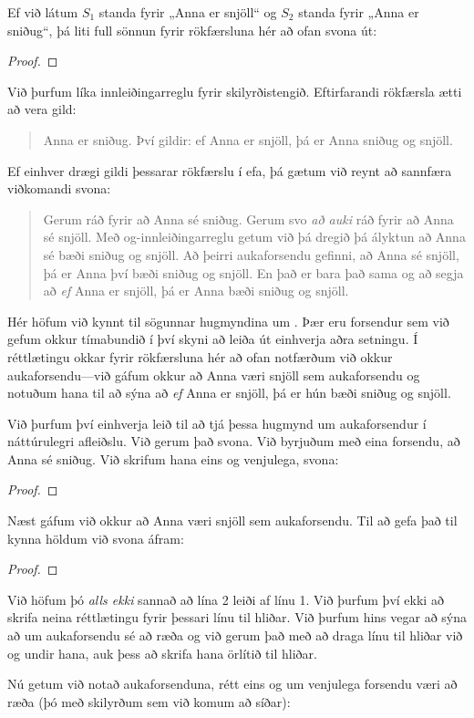 Ef við látum $S_1$ standa fyrir „Anna er snjöll“ og $S_2$ standa fyrir „Anna er sniðug“, þá liti full sönnun fyrir rökfærsluna hér að ofan svona út:
\begin{proof}
	\close
	 
\end{proof}
Við þurfum líka innleiðingarreglu fyrir skilyrðistengið. Eftirfarandi rökfærsla ætti að vera gild:
	\begin{quote}
		Anna er sniðug. Því gildir: ef Anna er snjöll, þá er Anna sniðug og snjöll.
	\end{quote}
Ef einhver drægi gildi þessarar rökfærslu í efa, þá gætum við reynt að sannfæra viðkomandi svona:
\begin{quote}
	Gerum ráð fyrir að Anna sé sniðug. Gerum svo \emph{að auki} ráð fyrir að Anna sé snjöll. Með og-innleiðingarreglu getum við þá dregið þá ályktun að Anna sé bæði sniðug og snjöll. Að þeirri aukaforsendu gefinni, að Anna sé snjöll, þá er Anna því bæði sniðug og snjöll. En það er bara það sama og að segja að \emph{ef} Anna er snjöll, þá er Anna bæði sniðug og snjöll.
\end{quote}
Hér höfum við kynnt til sögunnar hugmyndina um . Þær eru forsendur sem við gefum okkur tímabundið í því skyni að leiða út einhverja aðra setningu. Í réttlætingu okkar fyrir rökfærsluna hér að ofan notfærðum við okkur aukaforsendu---við gáfum okkur að Anna væri snjöll sem aukaforsendu og notuðum hana til að sýna að \emph{ef} Anna er snjöll, þá er hún bæði sniðug og snjöll. 

Við þurfum því einhverja leið til að tjá þessa hugmynd um aukaforsendur í náttúrulegri afleiðslu. Við gerum það svona. Við byrjuðum með eina forsendu, að Anna sé sniðug. Við skrifum hana eins og venjulega, svona:
	\begin{proof}
	\end{proof}
Næst gáfum við okkur að Anna væri snjöll sem aukaforsendu. Til að gefa það til kynna höldum við svona áfram:	
	\begin{proof}
		\open
	\end{proof}
Við höfum þó \emph{alls ekki} sannað að lína 2 leiði af línu 1. Við þurfum því ekki að skrifa neina réttlætingu fyrir þessari línu til hliðar. Við þurfum hins vegar að sýna að um aukaforsendu sé að ræða og við gerum það með að draga línu til hliðar við og undir hana, auk þess að skrifa hana örlítið til hliðar. 

Nú getum við notað aukaforsenduna, rétt eins og um venjulega forsendu væri að ræða (þó með skilyrðum sem við komum að síðar): 

